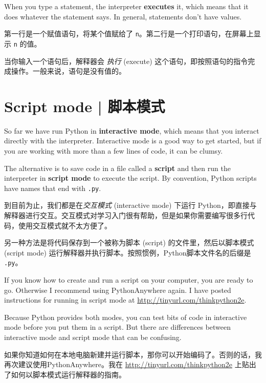 When you type a statement, the interpreter {\bf executes} it,
which means that it does whatever the statement says.  In general,
statements don't have values.

第一行是一个赋值语句，将某个值赋给了 \lstinline{n}。第二行是一个打印语句，在屏幕上显示 \lstinline{n} 的值。

当你输入一个语句后，解释器会 \emph{执行} (execute) 这个语句，即按照语句的指令完成操作。一般来说，语句是没有值的。

\section{Script mode  |  脚本模式}

So far we have run Python in {\bf interactive mode}, which
means that you interact directly with the interpreter.
Interactive mode is a good way to get started,
but if you are working with more than a few lines of code, it can be
clumsy.

The alternative is to save code in a file called a {\bf script} and
then run the interpreter in {\bf script mode} to execute the script.  By
convention, Python scripts have names that end with {\tt .py}.
  

到目前为止，我们都是在\emph{交互模式} (interactive mode) 下运行 Python，即直接与解释器进行交互。交互模式对学习入门很有帮助，但是如果你需要编写很多行代码，使用交互模式就不太方便了。

另一种方法是将代码保存到一个被称为脚本 (script) 的文件里，然后以脚本模式 (script mode) 运行解释器并执行脚本。按照惯例，Python脚本文件名的后缀是 \lstinline{.py}。
  

If you know how to create and run a script on your computer, you
are ready to go.  Otherwise I recommend using PythonAnywhere again.
I have posted instructions for running in script mode at
\url{http://tinyurl.com/thinkpython2e}.

Because Python provides both modes,
you can test bits of code in interactive mode before you put them
in a script.  But there are differences between interactive mode
and script mode that can be confusing.
  

如果你知道如何在本地电脑新建并运行脚本，那你可以开始编码了。否则的话，我再次建议使用PythonAnywhere。我在 \href{http://tinyurl.com/thinkpython2e}{http://tinyurl.com/thinkpython2e} 上贴出了如何以脚本模式运行解释器的指南。

